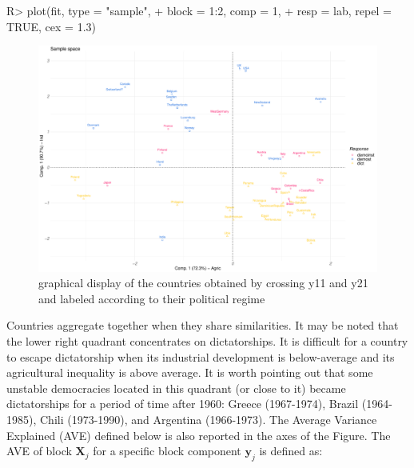 \documentclass[
]{jss}
\begin{document}
\footnotesize

\begin{CodeChunk}
\begin{CodeInput}
R> plot(fit, type = "sample",
+      block = 1:2, comp = 1,
+      resp = lab, repel = TRUE, cex = 1.3)
\end{CodeInput}
\begin{figure}

{\centering \includegraphics{RGCCA_21022023_files/figure-latex/unnamed-chunk-8-1} 

}

\caption[graphical display of the countries obtained by crossing y11 and y21 and labeled according to their political regime]{graphical display of the countries obtained by crossing y11 and y21 and labeled according to their political regime}\label{fig:unnamed-chunk-8}
\end{figure}
\end{CodeChunk}

\normalsize

Countries aggregate together when they share similarities. It may be
noted that the lower right quadrant concentrates on dictatorships. It is
difficult for a country to escape dictatorship when its industrial
development is below-average and its agricultural inequality is above
average. It is worth pointing out that some unstable democracies located
in this quadrant (or close to it) became dictatorships for a period of
time after 1960: Greece (1967-1974), Brazil (1964-1985), Chili
(1973-1990), and Argentina (1966-1973). The Average Variance Explained
(AVE) defined below is also reported in the axes of the Figure. The AVE
of block \(\mathbf{X}_j\) for a specific block component
\(\mathbf{y}_j\) is defined as:
\end{document}
